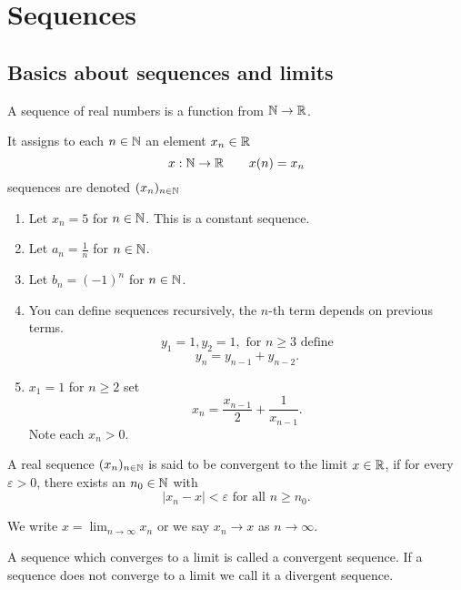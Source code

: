 \documentclass[10pt, a4paper]{article}
\newcommand{\seq}[1][x]{(#1_n)_{n \in \N}}
\begin{document}
\newpage

\section{Sequences}

\subsection{Basics about sequences and limits}
\begin{definition}
    A sequence of real numbers is a function from $\mathbb{N} \to \mathbb{R}$.
\end{definition}

It assigns to each $n \in \mathbb{N}$ an element $x_n \in \mathbb{R}$
\[
x : \mathbb{N} \to \mathbb{R}\qquad x(n) = x_n
\]
sequences are denoted $(x_n)_{n \in \mathbb{N}}$

\begin{example}\phantom{}
    \begin{enumerate}[label = (\alph*)]
        \item Let $x_n = 5$ for $n \in \mathbb{N}$. This is a constant sequence.
        \item Let $a_n = \frac{1}{n}$ for $n \in \mathbb{N}$.
        \item Let $b_n = (-1) ^ n$ for $n \in \mathbb{N}$.
        \item You can define sequences recursively, the $n$-th term depends on previous terms.
        \[
        y_1 = 1, y_2 = 1,\text{ for } n \geq 3\text{ define}
        \]
        \[
        y_n = y_{n - 1} + y_{n - 2}.
        \]
        \item $x_1 = 1$ for $n \geq 2$ set
        \[
        x_n = \frac{x_{n - 1}}{2} + \frac{1}{x_{n - 1}}.
        \]
        Note each $x_n > 0$.
    \end{enumerate}
\end{example}

\begin{definition}
    A real sequence $\seq$ is said to be convergent to the limit $x \in \mathbb{R}$, if for every $\varepsilon > 0$, there exists an $n_0 \in \mathbb{N}$ with
    \[
    |x_n - x| < \varepsilon\text{ for all } n \geq n_0.
    \]
\end{definition}
We write $x = \lim_{n \to \infty} x_n$ or we say $x_n \to x$ as $n \to \infty$.

A sequence which converges to a limit is called a convergent sequence.
If a sequence does not converge to a limit we call it a divergent sequence.
\end{document}
